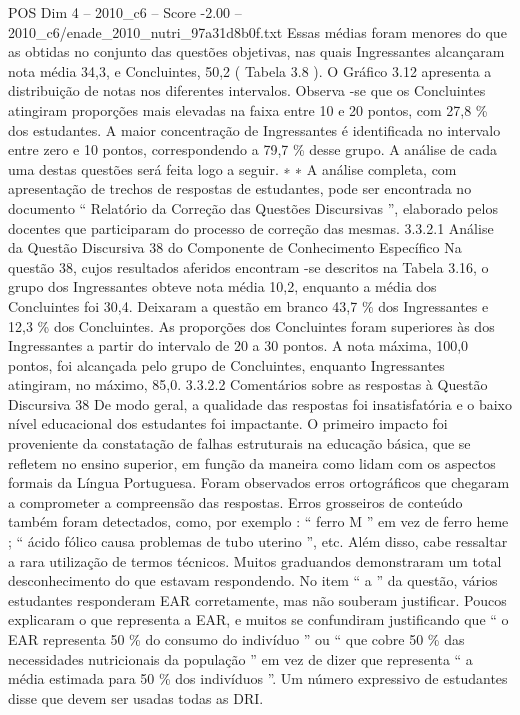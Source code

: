 \begin{textsample}{POS Dim 4 – 2010\_c6 – Score -2.00 – 2010\_c6/enade\_2010\_nutri\_97a31d8b0f.txt}
Essas médias foram menores do que as obtidas no conjunto das questões objetivas, nas quais Ingressantes alcançaram nota média 34,3, e Concluintes, 50,2 ( Tabela 3.8 ).
O Gráfico 3.12 apresenta a distribuição de notas nos diferentes intervalos.
Observa -se que os Concluintes atingiram proporções mais elevadas na faixa entre 10 e 20 pontos, com 27,8 \% dos estudantes.
A maior concentração de Ingressantes é identificada no intervalo entre zero e 10 pontos, correspondendo a 79,7 \% desse grupo.
A análise de cada uma destas questões será feita logo a seguir. ∗ ∗ A análise completa, com apresentação de trechos de respostas de estudantes, pode ser encontrada no documento “ Relatório da Correção das Questões Discursivas ”, elaborado pelos docentes que participaram do processo de correção das mesmas. 3.3.2.1 Análise da Questão Discursiva 38 do Componente de Conhecimento Específico Na questão 38, cujos resultados aferidos encontram -se descritos na Tabela 3.16, o grupo dos Ingressantes obteve nota média 10,2, enquanto a média dos Concluintes foi 30,4.
Deixaram a questão em branco 43,7 \% dos Ingressantes e 12,3 \% dos Concluintes.
As proporções dos Concluintes foram superiores às dos Ingressantes a partir do intervalo de 20 a 30 pontos.
A nota máxima, 100,0 pontos, foi alcançada pelo grupo de Concluintes, enquanto Ingressantes atingiram, no máximo, 85,0. 3.3.2.2 Comentários sobre as respostas à Questão Discursiva 38 De modo geral, a qualidade das respostas foi insatisfatória e o baixo nível educacional dos estudantes foi impactante.
O primeiro impacto foi proveniente da constatação de falhas estruturais na educação básica, que se refletem no ensino superior, em função da maneira como lidam com os aspectos formais da Língua Portuguesa.
Foram observados erros ortográficos que chegaram a comprometer a compreensão das respostas.
Erros grosseiros de conteúdo também foram detectados, como, por exemplo : “ ferro M ” em vez de ferro heme ; “ ácido fólico causa problemas de tubo uterino ”, etc.
Além disso, cabe ressaltar a rara utilização de termos técnicos.
Muitos graduandos demonstraram um total desconhecimento do que estavam respondendo.
No item “ a ” da questão, vários estudantes responderam EAR corretamente, mas não souberam justificar.
Poucos explicaram o que representa a EAR, e muitos se confundiram justificando que “ o EAR representa 50 \% do consumo do indivíduo ” ou “ que cobre 50 \% das necessidades nutricionais da população ” em vez de dizer que representa “ a média estimada para 50 \% dos indivíduos ”.
Um número expressivo de estudantes disse que devem ser usadas todas as DRI.

\end{textsample}
